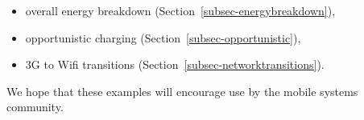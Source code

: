 \begin{itemize}

\item overall energy breakdown (Section~\ref{subsec-energybreakdown}),

\item opportunistic charging (Section~\ref{subsec-opportunistic}),

\item 3G to Wifi transitions (Section~\ref{subsec-networktransitions}).

\end{itemize}

We hope that these examples will encourage \PhoneLab{} use by the mobile systems
community.
